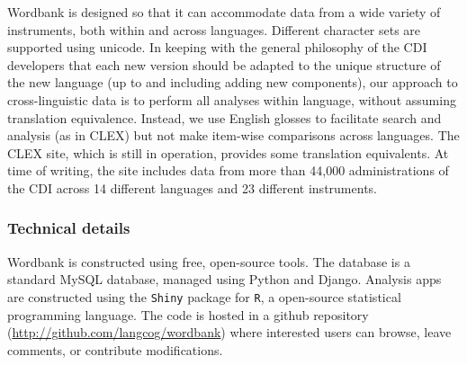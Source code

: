 \documentclass[doc,noapacite]{apa2}
\begin{document}


Wordbank is designed so that it can accommodate data from a wide variety of instruments, both within and across languages. Different character sets are supported using unicode.  In keeping with the general philosophy of the CDI developers that each new version should be adapted to the unique structure of the new language (up to and including adding new components), our approach to cross-linguistic data is to perform all analyses within language, without assuming translation equivalence. Instead, we use English glosses to facilitate search and analysis (as in CLEX) but not make item-wise comparisons across languages. The CLEX site, which is still in operation, provides some translation equivalents. At time of writing, the site includes data from more than 44,000 administrations of the CDI across 14 different languages and 23 different instruments. 

\subsubsection{Technical details}

Wordbank is constructed using free, open-source tools. The database is a standard MySQL database, managed using Python and Django. Analysis apps are constructed using the \texttt{Shiny} package for \texttt{R}, a open-source statistical programming language.  The code is hosted in a github repository (\url{http://github.com/langcog/wordbank}) where interested users can browse, leave comments, or contribute modifications. 
\end{document}
